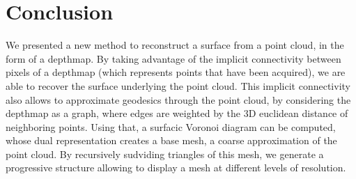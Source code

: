 \documentclass[11pt,fleqn]{book} %
\begin{document}
\section{Conclusion}

We presented a new method to reconstruct a surface from a point cloud, in the form of a depthmap. 
By taking advantage of the implicit connectivity between pixels of a depthmap (which represents points that have been acquired), we are able to recover the surface underlying the point cloud.
This implicit connectivity also allows to approximate geodesics through the point cloud, by considering the depthmap as a graph, where edges are weighted by the 3D euclidean distance of neighboring points.
Using that, a surfacic Voronoi diagram can be computed, whose dual representation creates a base mesh, a coarse approximation of the point cloud.
By recursively sudviding triangles of this mesh, we generate a progressive structure allowing to display a mesh at different levels of resolution.




\printindex
\end{document}
